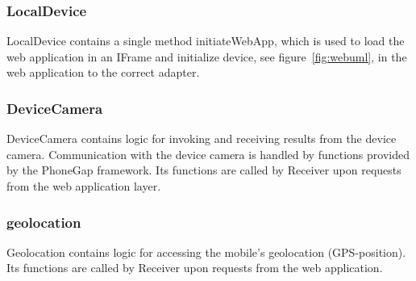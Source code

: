 \subsubsection{LocalDevice}
LocalDevice contains a single method initiateWebApp, which is used to load the web application in an IFrame and initialize device, see figure~\ref{fig:webuml}, in the web application to the correct adapter.

\subsubsection{DeviceCamera}
DeviceCamera contains logic for invoking and receiving results from the device camera. Communication with the device camera is handled by functions provided by the PhoneGap framework. Its functions are called by Receiver upon requests from the web application layer.

\subsubsection{geolocation}
Geolocation contains logic for accessing the mobile's geolocation (GPS-position). Its functions are called by Receiver upon requests from the web application.

